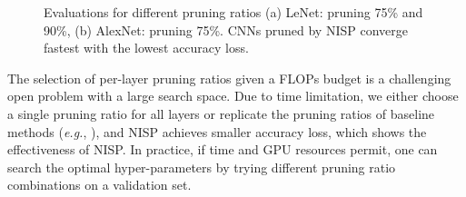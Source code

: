 \documentclass[10pt,twocolumn,letterpaper]{article}
\def\eg{\emph{e.g.}}
\begin{document}
\begin{figure}
\centering     %
{}

\caption{Evaluations for different pruning ratios (a) LeNet: pruning 75\% and 90\%, (b) AlexNet: pruning 75\%.  
CNNs pruned by NISP converge fastest with the lowest accuracy loss.}
\label{SuperALl}
\end{figure}%
The selection of per-layer pruning ratios given a FLOPs budget is a challenging open problem with a large search space. Due to time limitation, we either choose a single pruning ratio for all layers or replicate the pruning ratios of baseline methods (\eg, \cite{Tucker}), and NISP achieves smaller accuracy loss, which shows the effectiveness of NISP. In practice, if time and GPU resources permit, one can search the optimal hyper-parameters by trying different pruning ratio combinations on a validation set.
\end{document}
